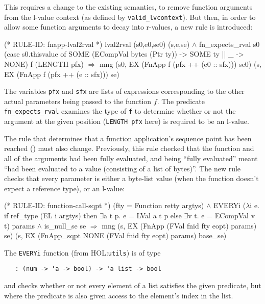 \documentclass[11pt]{article}
\newcommand{\HOLfile}[1]{HOL:\texttt{#1}}
\begin{document}
This requires a change to the existing semantics, to remove function
arguments from the l-value context (as defined by
\texttt{valid_lvcontext}).
But then, in order to allow some function arguments to decay into
r-values, a new rule is introduced:%
%
\begin{stdrule}
(* RULE-ID: fnapp-lval2rval *)
     lval2rval (s0,e0,se0) (s,e,se) \(\land\)
     fn_expects_rval s0
       (case s0.thisvalue of
           SOME (ECompVal bytes (Ptr ty)) -> SOME ty
        || _ -> NONE)
       f
       (LENGTH pfx)
   \(\Rightarrow\)
     mng (s0, EX (FnApp f (pfx ++ (e0 :: sfx))) se0)
         (s, EX (FnApp f (pfx ++ (e :: sfx))) se)
\end{stdrule}
The variables \texttt{pfx} and \texttt{sfx} are lists of expressions
corresponding to the other actual parameters being passed to the
function $f$.  The predicate \texttt{fn_expects_rval} examines the
type of \texttt{f} to determine whether or not the argument at the
given position (\texttt{LENGTH~pfx} here) is required to be an l-value.

The rule that determines that a function application's sequence point
has been reached () must also change.
Previously, this rule checked that the function and all of the
arguments had been fully evaluated, and being ``fully evaluated''
meant ``had been evaluated to a value (consisting of a list of
bytes)''.  The new rule checks that every parameter is either a
byte-list value (when the function doesn't expect a reference type),
or an l-value:
%
\begin{stdrule}
(* RULE-ID: function-call-sqpt *)
     (fty = Function retty argtys) \(\land\)
     EVERYi (\(\lambda\)i e. if ref_type (EL i argtys) then
                     \(\exists\)a t p. e = LVal a t p
                   else \(\exists\)v t. e = ECompVal v t)
            params \(\land\)
     is_null_se se
   \(\Rightarrow\)
     mng (s, EX (FnApp (FVal fnid fty eopt) params) se)
         (s, EX (FnApp_sqpt NONE (FVal fnid fty eopt) params)
                base_se)
\end{stdrule}
The \texttt{EVERYi} function (from \HOLfile{utils}) is of type
\begin{verbatim}
   : (num -> 'a -> bool) -> 'a list -> bool
\end{verbatim}
and checks whether or not every element of a list satisfies the given
predicate, but where the predicate is also given access to the
element's index in the list.
\end{document}
